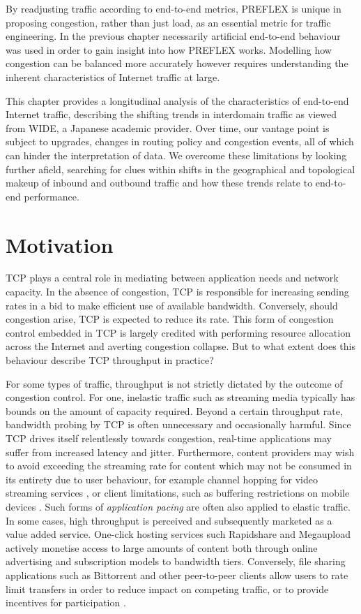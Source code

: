 By readjusting traffic according to end-to-end metrics, \ac{PREFLEX} is unique in proposing congestion, rather than just load, as an essential metric for traffic engineering.
In the previous chapter necessarily artificial end-to-end behaviour was used in order to gain insight into how \ac{PREFLEX} works.
Modelling how congestion can be balanced more accurately however requires understanding the inherent characteristics of Internet traffic at large.

This chapter provides a longitudinal analysis of the characteristics of end-to-end Internet traffic, describing the shifting trends in interdomain traffic as viewed from WIDE, a Japanese academic provider.
Over time, our vantage point is subject to upgrades, changes in routing policy and congestion events, all of which can hinder the interpretation of data.
We overcome these limitations by looking further afield, searching for clues within shifts in the geographical and topological makeup of inbound and outbound traffic and how these trends relate to end-to-end performance.

\section{Motivation}

TCP plays a central role in mediating between application needs and network capacity.
In the absence of congestion, TCP is responsible for increasing sending rates in a bid to make efficient use of available bandwidth.
Conversely, should congestion arise, TCP is expected to reduce its rate.
This form of congestion control embedded in TCP is largely credited with performing resource allocation across the Internet and averting congestion collapse.
But to what extent does this behaviour describe TCP throughput in practice?

For some types of traffic, throughput is not strictly dictated by the outcome of congestion control.
For one, inelastic traffic such as streaming media typically has bounds on the amount of capacity required.
Beyond a certain throughput rate, bandwidth probing by TCP is often unnecessary and occasionally harmful.
Since TCP drives itself relentlessly towards congestion, real-time applications may suffer from increased latency and jitter.
Furthermore, content providers may wish to avoid exceeding the streaming rate for content which may not be consumed in its entirety due to user behaviour, for example channel hopping for video streaming services \cite{iptvWorkload}, or client limitations, such as buffering restrictions on mobile devices \cite{Rao:2011p547}.
Such forms of \emph{application pacing} are often also applied to elastic traffic.
In some cases, high throughput is perceived and subsequently marketed as a value added service.
One-click hosting services such Rapidshare and Megaupload \cite{oneclick1, SanjuasCuxart:2012p588} actively monetise access to large amounts of content both through online advertising and subscription models to bandwidth tiers.
Conversely, file sharing applications such as Bittorrent and other peer-to-peer clients allow users to rate limit transfers in order to reduce impact on competing traffic, or to provide incentives for participation \cite{bittorrentIMC}.

